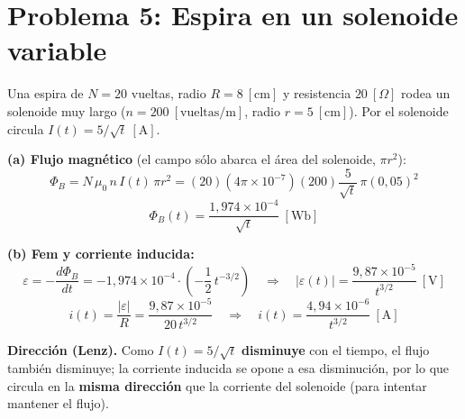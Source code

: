 \documentclass[12pt,letterpaper]{article}
\begin{document}
\vspace{0.5cm}

\section*{Problema 5: Espira en un solenoide variable}

\noindent Una espira de $N = 20$ vueltas, radio $R = 8\ [\text{cm}]$ y resistencia $20\ [\Omega]$
rodea un solenoide muy largo ($n = 200\ [\text{vueltas/m}]$, radio $r = 5\ [\text{cm}]$). Por el
solenoide circula $I(t) = 5/\sqrt{t}\ [\text{A}]$.

\medskip

\noindent\textbf{(a) Flujo magn\'etico} (el campo s\'olo abarca el \'area del solenoide,
$\pi r^2$):
\[
    \Phi_B = N\,\mu_0\,n\,I(t)\,\pi r^2
           = (20)(4\pi\times10^{-7})(200)\frac{5}{\sqrt{t}}\,\pi(0{,}05)^2
\]
\[
    \boxed{\Phi_B(t) = \frac{1{,}974\times10^{-4}}{\sqrt{t}}\ [\text{Wb}]}
\]

\noindent\textbf{(b) Fem y corriente inducida:}
\[
    \varepsilon = -\frac{d\Phi_B}{dt} = -1{,}974\times10^{-4}\cdot\left(-\frac{1}{2}\,t^{-3/2}\right)
    \quad\Longrightarrow\quad
    \boxed{|\varepsilon(t)| = \frac{9{,}87\times10^{-5}}{t^{3/2}}\ [\text{V}]}
\]
\[
    i(t) = \frac{|\varepsilon|}{R} = \frac{9{,}87\times10^{-5}}{20\,t^{3/2}}
    \quad\Longrightarrow\quad
    \boxed{i(t) = \frac{4{,}94\times10^{-6}}{t^{3/2}}\ [\text{A}]}
\]

\noindent\textbf{Direcci\'on (Lenz).} Como $I(t)=5/\sqrt{t}$ \textbf{disminuye} con el tiempo, el
flujo tambi\'en disminuye; la corriente inducida se opone a esa disminuci\'on, por lo que circula
en la \textbf{misma direcci\'on} que la corriente del solenoide (para intentar mantener el flujo).
\end{document}

